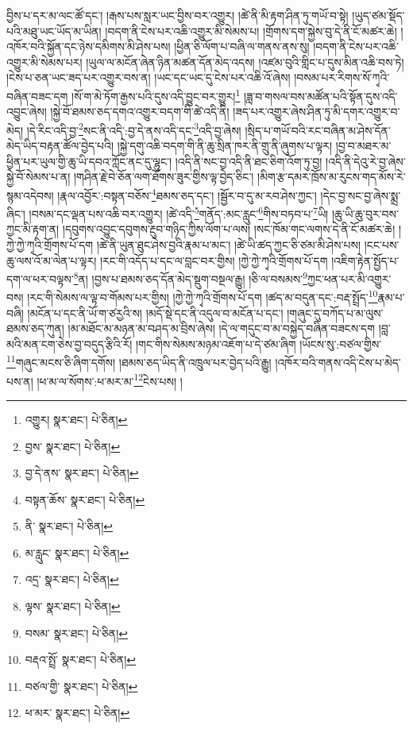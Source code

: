 བྱིས་པ་དར་མ་ལང་ཚོ་དང་། །རྒས་པས་སླར་ཡང་བྱིས་བར་འགྱུར། །ཚེ་ནི་མི་རྟག་ཤིན་ཏུ་གཡོ་བ་སྟེ། །ཡུད་ཙམ་སྡོད་པའི་མཐུ་ཡང་ཡོད་མ་ཡིན། །བདག་ནི་ངེས་པར་འཆི་འགྱུར་མི་སེམས་པ། །གྲོགས་དག་སྐྱེས་བུ་དེ་ནི་ངོ་མཚར་ཆེ། །འཁོར་བའི་སྐྱོན་དང་ཉེས་དམིགས་མི་ཤེས་པས། །ཕྱིན་ཅི་ལོག་པ་བཞི་ལ་གནས་ནས་སུ། །བདག་ནི་ངེས་པར་འཆི་འགྱུར་མི་སེམས་པར། །ཡུལ་ལ་མངོན་ཞེན་ཉིན་མཚན་དོན་མེད་འདས། །འཛམ་བུའི་གླིང་པ་དུས་མིན་འཆི་བས་ཏེ། །ངེས་པ་ཅན་ཡང་ཟད་པར་འགྱུར་བས་ན། །ཡང་དང་ཡང་དུ་ངེས་པར་འཆི་འོ་ཞེས། །བསམ་པར་རིགས་སོ་ཀྭའི་བཞིན་བཟང་དག །སོ་ག་མེ་ཏོག་རྒྱས་པའི་དུས་འདི་བྱུང་བར་གྱུར།\footnote{འགྱུར།  སྣར་ཐང་།  པེ་ཅིན། } །ཟླ་བ་གསལ་བས་མཚོན་པའི་སྟོན་དུས་འདི་འབྱུང་ཞེས། །སྐྱེ་བོ་ཐམས་ཅད་དགའ་འགྱུར་བདག་གི་ཚེ་འདི་ནི། །ཟད་པར་འགྱུར་ཞེས་ཤིན་ཏུ་མི་དགར་འགྱུར་བ་མེད། །དེ་རིང་འདི་བྱ་\footnote{བྱས་  སྣར་ཐང་།  པེ་ཅིན། }སང་ནི་འདི་:བྱ་དེ་ནས་འདི་དང་\footnote{བྱ་དེ་ནས་  སྣར་ཐང་།  པེ་ཅིན། }འདི་བྱ་ཞེས། །སྲིད་པ་གཡོ་བའི་རང་བཞིན་མ་ཤེས་དོན་མེད་ཡིད་བརྟན་ཚོལ་བྱེད་པའི། །སྐྱེ་དགུ་འཆི་བདག་གི་ནི་ཆུ་སྲིན་ཁར་ནི་གྲུ་ནི་ཞུགས་པ་ལྟར། །བྱ་བ་མཐར་མ་ཕྱིན་པར་ཡུལ་གྱི་ཆུ་ཡི་དབའ་ཀློང་ནང་དུ་ལྷུང་། །འདི་ནི་སང་བྱ་འདི་ནི་ཐང་ཅིག་འོག་ཏུ་བྱ། །འདི་ནི་དེའུ་རེ་བྱ་ཞེས་སྐྱེ་བོ་སེམས་པ་ན། །གཤིན་རྗེ་བེ་ཅོན་ལག་ཐོགས་ཟུར་གྱིས་ལྟ་བྱེད་ཅིང་། །མིག་རྩ་དམར་ཁྲོས་མ་རུངས་གད་མོས་རེ་སྙམ་འདེབས། །རྣལ་འབྱོར་:བསྟན་བཅོས་\footnote{བསྟན་ཆོས་  སྣར་ཐང་།  པེ་ཅིན། }ཐམས་ཅད་དང་། །སྦྱོར་བ་དུ་མ་རབ་ཤེས་ཀྱང་། །དེང་བྱ་སང་བྱ་ཞེས་སྨྲ་ཞིང་། །བསམ་དང་ལྡན་པས་འཆི་བར་འགྱུར། །ཚེ་འདི་\footnote{ནི་  སྣར་ཐང་།  པེ་ཅིན། }གནོད་:མང་རླུང་\footnote{མ་རླུང་  སྣར་ཐང་།  པེ་ཅིན། }གིས་བཏབ་པ་\footnote{འདྲ་  སྣར་ཐང་།  པེ་ཅིན། }ཡི། །ཆུ་ཡི་ཆུ་བུར་བས་ཀྱང་མི་རྟག་ན། །དབུགས་འབྱུང་དབུགས་རྔུབ་གཉིད་ཀྱིས་ལོག་པ་ལས། །སང་ཁོམ་གང་ལགས་དེ་ནི་ངོ་མཚར་ཆེ། །ཀྱེ་ཀྱེ་ཀྭའི་གྲོགས་པོ་དག །ཚེ་ནི་ཡུན་ཐུང་ཤེས་བྱའི་རྣམ་པ་མང་། །ཚེ་ཡི་ཚད་ཀྱང་ཅི་ཙམ་མི་ཤེས་པས། །ངང་པས་ཆུ་ལས་འོ་མ་ལེན་པ་ལྟར། །རང་གི་འདོད་པ་དང་ལ་བླང་བར་གྱིས། །ཀྱེ་ཀྱེ་ཀྭའི་གྲོགས་པོ་དག །འཇིག་རྟེན་སྤྱོད་པ་དག་ལ་ཕར་བལྟས་\footnote{ལྟས་  སྣར་ཐང་།  པེ་ཅིན། }ན། །བྱས་པ་ཐམས་ཅད་དོན་མེད་སྡུག་བསྔལ་རྒྱུ། །ཅི་ལ་བསམས་\footnote{བསམ་  སྣར་ཐང་།  པེ་ཅིན། }ཀྱང་ཕན་པར་མི་འགྱུར་བས། །རང་གི་སེམས་ལ་ལྟ་བ་གོམས་པར་གྱིས། །ཀྱེ་ཀྱེ་ཀྭའི་གྲོགས་པོ་དག །ཚད་མ་བདུན་དང་:བརྡ་སྤྲོད་\footnote{བརྡའ་སྤྲོ་  སྣར་ཐང་།  པེ་ཅིན། }རྣམ་པ་བཞི། །མངོན་པ་དང་ནི་ཡོ་ག་ཙརྱའི་ས། །མདོ་སྡེ་དང་ནི་འདུལ་བ་མངོན་པ་དང་། །གཞུང་དུ་བཀོད་པ་མ་ལུས་ཐམས་ཅད་ཀུན། །མ་མཐོང་མ་མཉན་མ་བཤད་མ་བྲིས་ཞེས། །དེ་ལ་གདུང་བ་མ་བསྐྱེད་བཞིན་བཟངས་དག །བླ་མའི་མན་ངག་ཅེས་བྱ་བདུད་རྩིའི་རོ། །གང་གིས་སེམས་མཉམ་འཇོག་པ་དེ་ཙམ་ཞིག །ཡོངས་སུ་:བཙལ་གྱིས་\footnote{བཙལ་གྱི་  སྣར་ཐང་།  པེ་ཅིན། }གཞུང་མངས་ཅི་ཞིག་དགོས། །ཐམས་ཅད་ཡིད་ནི་འཁྲུལ་པར་བྱེད་པའི་རྒྱུ། །འཁོར་བའི་གནས་འདི་ངེས་པ་མེད་པས་ན། །ཕ་མ་ལ་སོགས་:ཕ་མར་མ་\footnote{ཕ་མར་  སྣར་ཐང་།  པེ་ཅིན། }ངེས་པས། །
